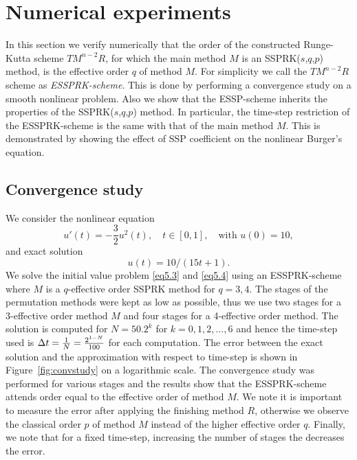 \section{Numerical experiments}\label{sec:numerics}

In this section we verify numerically that the order of the constructed Runge-Kutta scheme $TM^{n-2}R$, for which the main method $M$ is an SSPRK($s$,$q$,$p$) method, is the effective order $q$ of method $M$. For simplicity we call the $TM^{n-2}R$ scheme as \emph{ESSPRK-scheme}. This is done by performing a convergence study on a smooth nonlinear problem. Also we show that the ESSP-scheme inherits the properties of the SSPRK($s$,$q$,$p$) method. In particular, the time-step restriction of the ESSPRK-scheme is the same with that of the main method $M$. This is demonstrated by showing the effect of SSP coefficient on the nonlinear Burger's equation.

\subsection{Convergence study}\label{subsec:convergence}

We consider the nonlinear equation
\begin{equation}\label{eq5.3}
    u'(t) = -\frac{3}{2}u^{2}(t), \quad t \in [0,1], \quad \text{with } u(0) = 10,
\end{equation}
and exact solution
\begin{equation}\label{eq5.4}
    u(t) = 10/(15t + 1).
\end{equation}
We solve the initial value problem \eqref{eq5.3} and \eqref{eq5.4} using an ESSPRK-scheme where $M$ is a $q$-effective order SSPRK method for $q = 3, 4$. 
The stages of the permutation methods were kept as low as possible, thus we use two stages for a 3-effective order method $M$ and four stages for a 4-effective order method. 
The solution is computed for $N = 50.2^{k}$ for $k = 0, 1, 2, \dots, 6$ and hence the time-step used is $\Delta t = \frac{1}{N} = \frac{2^{1-N}}{100}$ for each computation. 
The error between the exact solution and the approximation with respect to time-step is shown in Figure~\ref{fig:convstudy} on a logarithmic scale.
The convergence study was performed for various stages and the results show that the ESSPRK-scheme attends order equal to the effective order of method $M$. 
We note it is important to measure the error after applying the finishing method $R$, otherwise we observe the
classical order $p$ of method $M$ instead of the higher effective order $q$. 
Finally, we note that for a fixed time-step, increasing the number of stages the decreases the error.

